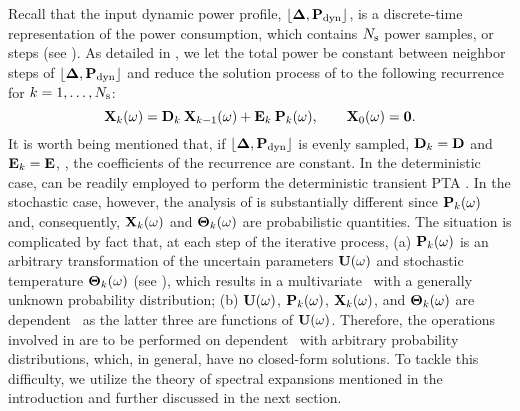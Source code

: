 Recall that the input dynamic power profile, $\profPdyn$, is a discrete-time representation of the power consumption, which contains $N_\text{s}$ power samples, or steps (see ). As detailed in , we let the total power be constant between neighbor steps of $\profPdyn$ and reduce the solution process of  to the following recurrence for $k = 1, \dotsc, N_\text{s}$:
\begin{equation} \elabel{recurrence}
  \vX_k(\o) = \mCF_k \: \vX_{k - 1}(\o) + \mCS_k \: \vP_k(\o), \qquad \vX_0(\o) = \vZero.
\end{equation}
It is worth being mentioned that, if $\profPdyn$ is evenly sampled, $\mCF_k = \mCF$ and $\mCS_k = \mCS$, \ie, the coefficients of the recurrence are constant. In the deterministic case,  can be readily employed to perform the deterministic transient PTA \cite{thiele2011, ukhov2012}. In the stochastic case, however, the analysis of  is substantially different since $\mathbf{P}_k(\omega)$ and, consequently, $\mathbf{X}_k(\omega)$ and ${\boldsymbol\Theta}_k(\omega)$ are probabilistic quantities. The situation is complicated by fact that, at each step of the iterative process, (a) $\mathbf{P}_k(\omega)$ is an arbitrary transformation of the uncertain parameters $\mathbf{U}(\omega)$ and stochastic temperature ${\boldsymbol\Theta}_k(\omega)$ (see ), which results in a multivariate \rv\ with a generally unknown probability distribution; (b) $\mathbf{U}(\omega)$, $\mathbf{P}_k(\omega)$, $\mathbf{X}_k(\omega)$, and ${\boldsymbol\Theta}_k(\omega)$ are dependent \rvs\ as the latter three are functions of $\mathbf{U}(\omega)$. Therefore, the operations involved in  are to be performed on dependent \rvs\ with arbitrary probability distributions, which, in general, have no closed-form solutions. To tackle this difficulty, we utilize the theory of spectral expansions mentioned in the introduction and further discussed in the next section.
